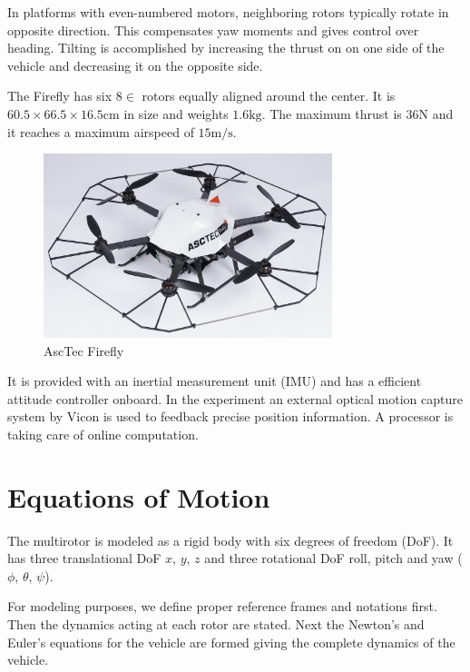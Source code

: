 In platforms with even-numbered motors, neighboring rotors typically rotate in opposite direction. This compensates yaw moments and gives control over heading. Tilting is accomplished by increasing the thrust on on one side of the vehicle and decreasing it on the opposite side.

The Firefly has six $8 \si{\in}$ rotors equally aligned around the center. It is $60.5 \times 66.5 \times 16.5 \si{\cm}$ in size and weights $1.6 \si{\kg}$. The maximum thrust is $36 \si{\N}$ and it reaches a maximum airspeed of $15 \si{\metre\per\second}$.

\begin{figure}
   \centering
   \includegraphics[width=0.75\textwidth]{images/firefly.jpg}
   \caption{AscTec Firefly \cite{www:asctec}}
   \label{pics:firefly}
\end{figure}

It is provided with an inertial measurement unit (IMU) and has a efficient attitude controller onboard. In the experiment an external optical motion capture system by Vicon is used to feedback precise position information. A processor is taking care of online computation.

\section{Equations of Motion}
The multirotor is modeled as a rigid body with six degrees of freedom (DoF). It has three translational DoF $x$, $y$, $z$ and three rotational DoF roll, pitch and yaw ($\phi$, $\theta$, $\psi$).

 For modeling purposes, we define proper reference frames and notations first. Then the dynamics acting at each rotor are stated. Next the Newton's and Euler's equations for the vehicle are formed giving the complete dynamics of the vehicle.

